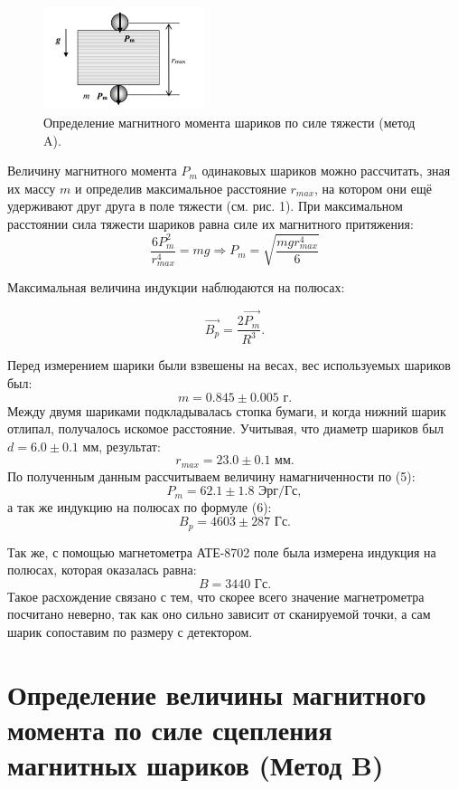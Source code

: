 \documentclass[a4paper, 14pt]{extarticle}%
\newcommand\ECaption[1]{%
     \captionsetup{font=footnotesize}%
     \caption{#1}}
\begin{document}
\begin{figure}
\begin{center}
\includegraphics[height=3cm]{teorA.png}
\end{center}
\ECaption{Определение магнитного момента шариков по
силе тяжести (метод A).}
\end{figure}

Величину магнитного момента $P_m$ одинаковых шариков
можно рассчитать, зная их массу $m$ и определив максимальное расстояние $r_{max}$, на котором они ещё удерживают друг
друга в поле тяжести (см. рис. 1). При максимальном расстоянии сила тяжести шариков равна силе их магнитного притяжения:
\begin{equation}
\dfrac{6P_m^2}{r_{max}^4} = mg \Longrightarrow P_m = \sqrt{\dfrac{mgr_{max}^4}{6}}
\end{equation}

Максимальная величина индукции
наблюдаются на полюсах:

\begin{equation}
\vec{B_p} = \frac{2\vec{P_m}}{R^3}.
\end{equation}

Перед измерением шарики были взвешены на весах, вес используемых шариков был:
\[m = 0.845 \pm 0.005 \text{ г}.\]
Между двумя шариками подкладывалась стопка бумаги, и когда нижний шарик отлипал, получалось искомое расстояние. Учитывая, что диаметр шариков был $d = 6.0 \pm 0.1$ мм, результат:
\[r_{max} = 23.0 \pm 0.1 \text{ мм}.\] 
По полученным данным рассчитываем величину намагниченности по (5):
\[P_m = 62.1 \pm 1.8 \text{ Эрг/Гс},\]
 а так же индукцию на полюсах по формуле (6):
\[B_p = 4603 \pm 287 \text{ Гс}.\]

Так же, с помощью магнетометра АТЕ-8702 поле была измерена индукция на полюсах, которая оказалась равна: 
\[B = 3440 \text{ Гс}.\]
Такое расхождение связано с тем, что скорее всего значение магнетрометра посчитано неверно, так как оно сильно зависит от сканируемой точки, а сам шарик сопоставим по размеру с детектором.

\section*{Определение величины магнитного момента по силе
сцепления магнитных шариков (Метод B)}
\end{document}
